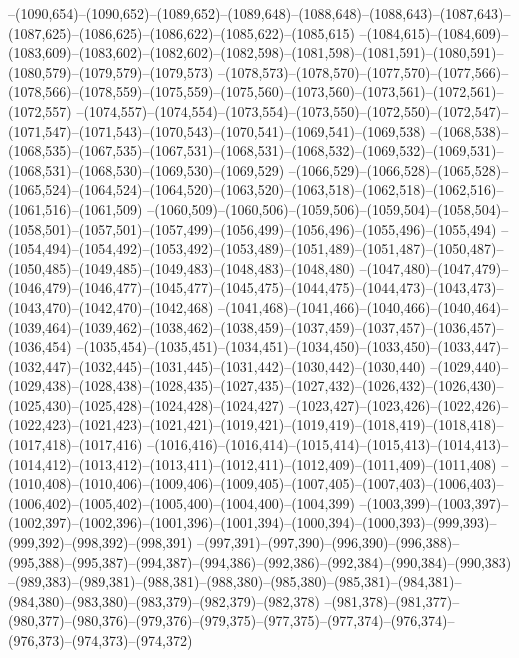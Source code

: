 --(1090,654)--(1090,652)--(1089,652)--(1089,648)--(1088,648)--(1088,643)--(1087,643)--(1087,625)--(1086,625)--(1086,622)--(1085,622)--(1085,615)
--(1084,615)--(1084,609)--(1083,609)--(1083,602)--(1082,602)--(1082,598)--(1081,598)--(1081,591)--(1080,591)--(1080,579)--(1079,579)--(1079,573)
--(1078,573)--(1078,570)--(1077,570)--(1077,566)--(1078,566)--(1078,559)--(1075,559)--(1075,560)--(1073,560)--(1073,561)--(1072,561)--(1072,557)
--(1074,557)--(1074,554)--(1073,554)--(1073,550)--(1072,550)--(1072,547)--(1071,547)--(1071,543)--(1070,543)--(1070,541)--(1069,541)--(1069,538)
--(1068,538)--(1068,535)--(1067,535)--(1067,531)--(1068,531)--(1068,532)--(1069,532)--(1069,531)--(1068,531)--(1068,530)--(1069,530)--(1069,529)
--(1066,529)--(1066,528)--(1065,528)--(1065,524)--(1064,524)--(1064,520)--(1063,520)--(1063,518)--(1062,518)--(1062,516)--(1061,516)--(1061,509)
--(1060,509)--(1060,506)--(1059,506)--(1059,504)--(1058,504)--(1058,501)--(1057,501)--(1057,499)--(1056,499)--(1056,496)--(1055,496)--(1055,494)
--(1054,494)--(1054,492)--(1053,492)--(1053,489)--(1051,489)--(1051,487)--(1050,487)--(1050,485)--(1049,485)--(1049,483)--(1048,483)--(1048,480)
--(1047,480)--(1047,479)--(1046,479)--(1046,477)--(1045,477)--(1045,475)--(1044,475)--(1044,473)--(1043,473)--(1043,470)--(1042,470)--(1042,468)
--(1041,468)--(1041,466)--(1040,466)--(1040,464)--(1039,464)--(1039,462)--(1038,462)--(1038,459)--(1037,459)--(1037,457)--(1036,457)--(1036,454)
--(1035,454)--(1035,451)--(1034,451)--(1034,450)--(1033,450)--(1033,447)--(1032,447)--(1032,445)--(1031,445)--(1031,442)--(1030,442)--(1030,440)
--(1029,440)--(1029,438)--(1028,438)--(1028,435)--(1027,435)--(1027,432)--(1026,432)--(1026,430)--(1025,430)--(1025,428)--(1024,428)--(1024,427)
--(1023,427)--(1023,426)--(1022,426)--(1022,423)--(1021,423)--(1021,421)--(1019,421)--(1019,419)--(1018,419)--(1018,418)--(1017,418)--(1017,416)
--(1016,416)--(1016,414)--(1015,414)--(1015,413)--(1014,413)--(1014,412)--(1013,412)--(1013,411)--(1012,411)--(1012,409)--(1011,409)--(1011,408)
--(1010,408)--(1010,406)--(1009,406)--(1009,405)--(1007,405)--(1007,403)--(1006,403)--(1006,402)--(1005,402)--(1005,400)--(1004,400)--(1004,399)
--(1003,399)--(1003,397)--(1002,397)--(1002,396)--(1001,396)--(1001,394)--(1000,394)--(1000,393)--(999,393)--(999,392)--(998,392)--(998,391)
--(997,391)--(997,390)--(996,390)--(996,388)--(995,388)--(995,387)--(994,387)--(994,386)--(992,386)--(992,384)--(990,384)--(990,383)
--(989,383)--(989,381)--(988,381)--(988,380)--(985,380)--(985,381)--(984,381)--(984,380)--(983,380)--(983,379)--(982,379)--(982,378)
--(981,378)--(981,377)--(980,377)--(980,376)--(979,376)--(979,375)--(977,375)--(977,374)--(976,374)--(976,373)--(974,373)--(974,372)
